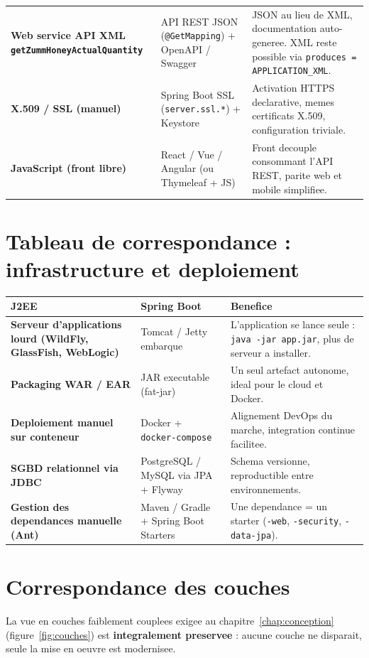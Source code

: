 \begin{xltabular}{\textwidth}{>{\bfseries}p{3cm} p{3.4cm} X}
Web service API XML \texttt{getZummHoneyActualQuantity} & API REST JSON (\texttt{@GetMapping}) + OpenAPI / Swagger & JSON au lieu de XML, documentation auto-generee. XML reste possible via \texttt{produces = APPLICATION\_XML}. \\
X.509 / SSL (manuel) & Spring Boot SSL (\texttt{server.ssl.*}) + Keystore & Activation HTTPS declarative, memes certificats X.509, configuration triviale. \\
JavaScript (front libre) & React / Vue / Angular (ou Thymeleaf + JS) & Front decouple consommant l'API REST, parite web et mobile simplifiee. \\
\bottomrule
\end{xltabular}

\section{Tableau de correspondance : infrastructure et deploiement}
\begin{xltabular}{\textwidth}{>{\bfseries}p{4cm} p{4.5cm} X}
\toprule
\textbf{J2EE} & \textbf{Spring Boot} & \textbf{Benefice} \\
\midrule
\endhead
Serveur d'applications lourd (WildFly, GlassFish, WebLogic) & Tomcat / Jetty embarque & L'application se lance seule : \texttt{java -jar app.jar}, plus de serveur a installer. \\
Packaging WAR / EAR & JAR executable (fat-jar) & Un seul artefact autonome, ideal pour le cloud et Docker. \\
Deploiement manuel sur conteneur & Docker + \texttt{docker-compose} & Alignement DevOps du marche, integration continue facilitee. \\
SGBD relationnel via JDBC & PostgreSQL / MySQL via JPA + Flyway & Schema versionne, reproductible entre environnements. \\
Gestion des dependances manuelle (Ant) & Maven / Gradle + Spring Boot Starters & Une dependance = un starter (\texttt{-web}, \texttt{-security}, \texttt{-data-jpa}). \\
\bottomrule
\end{xltabular}

\section{Correspondance des couches}
La vue en couches faiblement couplees exigee au chapitre~\ref{chap:conception}
(figure~\ref{fig:couches}) est \textbf{integralement preservee} : aucune couche
ne disparait, seule la mise en oeuvre est modernisee.


